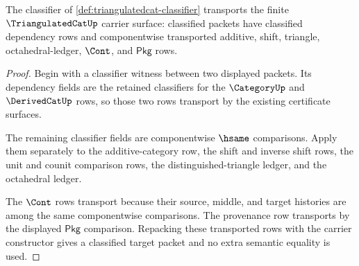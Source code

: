 \begin{theorem}
\label{thm:triangulatedcat-classifier-stability-obligation}
The classifier of \autoref{def:triangulatedcat-classifier} transports the
finite $\TriangulatedCatUp$ carrier surface: classified packets have
classified dependency rows and componentwise transported additive, shift,
triangle, octahedral-ledger, $\Cont$, and $\mathsf{Pkg}$ rows.
\end{theorem}
\begin{proof}
Begin with a classifier witness between two displayed packets. Its dependency
fields are the retained classifiers for the $\CategoryUp$ and $\DerivedCatUp$
rows, so those two rows transport by the existing certificate surfaces.

The remaining classifier fields are componentwise $\hsame$ comparisons.
Apply them separately to the additive-category row, the shift and inverse
shift rows, the unit and counit comparison rows, the distinguished-triangle
ledger, and the octahedral ledger.

The $\Cont$ rows transport because their source, middle, and target histories
are among the same componentwise comparisons. The provenance row transports
by the displayed $\mathsf{Pkg}$ comparison. Repacking these transported rows
with the carrier constructor gives a classified target packet and no extra
semantic equality is used.
\end{proof}

